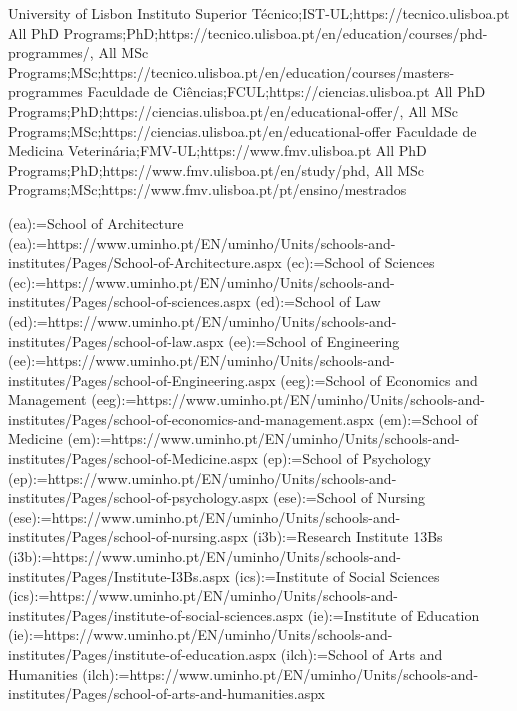\begin{ntUniversity}{University of Lisbon}
             {{Instituto Superior Técnico};{IST-UL};{https://tecnico.ulisboa.pt}}
             {{All PhD Programs};{PhD};{https://tecnico.ulisboa.pt/en/education/courses/phd-programmes/},%
              {All MSc Programs};{MSc};{https://tecnico.ulisboa.pt/en/education/courses/masters-programmes}}
             {{Faculdade de Ciências};{FCUL};{https://ciencias.ulisboa.pt}}
             {{All PhD Programs};{PhD};{https://ciencias.ulisboa.pt/en/educational-offer/},%
              {All MSc Programs};{MSc};{https://ciencias.ulisboa.pt/en/educational-offer}}
             {{Faculdade de Medicina Veterinária};{FMV-UL};{https://www.fmv.ulisboa.pt}}
             {{All PhD Programs};{PhD};{https://www.fmv.ulisboa.pt/en/study/phd},%
              {All MSc Programs};{MSc};{https://www.fmv.ulisboa.pt/pt/ensino/mestrados}}
\end{ntUniversity}


\schlname(ea):={School of Architecture}
\schlurl(ea):={https://www.uminho.pt/EN/uminho/Units/schools-and-institutes/Pages/School-of-Architecture.aspx}
\schlname(ec):={School of Sciences}
\schlurl(ec):={https://www.uminho.pt/EN/uminho/Units/schools-and-institutes/Pages/school-of-sciences.aspx}
\schlname(ed):={School of Law}
\schlurl(ed):={https://www.uminho.pt/EN/uminho/Units/schools-and-institutes/Pages/school-of-law.aspx}
\schlname(ee):={School of Engineering}
\schlurl(ee):={https://www.uminho.pt/EN/uminho/Units/schools-and-institutes/Pages/school-of-Engineering.aspx}
\schlname(eeg):={School of Economics and Management}
\schlurl(eeg):={https://www.uminho.pt/EN/uminho/Units/schools-and-institutes/Pages/school-of-economics-and-management.aspx}
\schlname(em):={School of Medicine}
\schlurl(em):={https://www.uminho.pt/EN/uminho/Units/schools-and-institutes/Pages/school-of-Medicine.aspx}
\schlname(ep):={School of Psychology}
\schlurl(ep):={https://www.uminho.pt/EN/uminho/Units/schools-and-institutes/Pages/school-of-psychology.aspx}
\schlname(ese):={School of Nursing}
\schlurl(ese):={https://www.uminho.pt/EN/uminho/Units/schools-and-institutes/Pages/school-of-nursing.aspx}
\schlname(i3b):={Research Institute 13Bs}
\schlurl(i3b):={https://www.uminho.pt/EN/uminho/Units/schools-and-institutes/Pages/Institute-I3Bs.aspx}
\schlname(ics):={Institute of Social Sciences}
\schlurl(ics):={https://www.uminho.pt/EN/uminho/Units/schools-and-institutes/Pages/institute-of-social-sciences.aspx}
\schlname(ie):={Institute of Education}
\schlurl(ie):={https://www.uminho.pt/EN/uminho/Units/schools-and-institutes/Pages/institute-of-education.aspx}
\schlname(ilch):={School of Arts and Humanities}
\schlurl(ilch):={https://www.uminho.pt/EN/uminho/Units/schools-and-institutes/Pages/school-of-arts-and-humanities.aspx}


